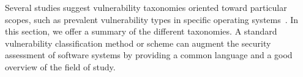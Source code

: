 





Several studies suggest vulnerability taxonomies oriented toward particular scopes, such as prevalent vulnerability types in specific operating systems~\cite{Tate2020CharacterizingVI}. In this section, we offer a summary of the different taxonomies. A standard vulnerability classification method or scheme can augment the security assessment of software systems by providing a common language and a good overview of the field of study. 

